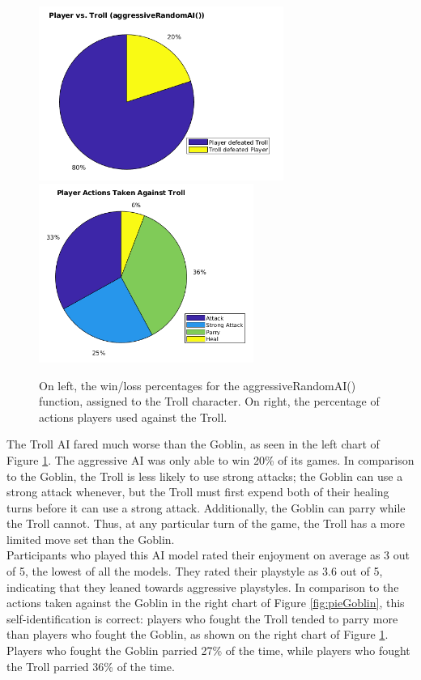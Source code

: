 \begin{figure}[H]
  \centering
  \includegraphics[width=8cm]{figures/trollWins.png}
  \includegraphics[width=7cm]{figures/actionsTroll.png}
  \caption{On left, the win/loss percentages for the aggressiveRandomAI() function, assigned to the Troll character. On right, the percentage of actions players used against the Troll.}
  \label{fig:pieTroll}
\end{figure}

The Troll AI fared much worse than the Goblin, as seen in the left chart of Figure \ref{fig:pieTroll}. The aggressive AI was only able to win 20\% of its games. In comparison to the Goblin, the Troll is less likely to use strong attacks; the Goblin can use a strong attack whenever, but the Troll must first expend both of their healing turns before it can use a strong attack. Additionally, the Goblin can parry while the Troll cannot. Thus, at any particular turn of the game, the Troll has a more limited move set than the Goblin.\\

Participants who played this AI model rated their enjoyment on average as 3 out of 5, the lowest of all the models. They rated their playstyle as 3.6 out of 5, indicating that they leaned towards aggressive playstyles. In comparison to the actions taken against the Goblin in the right chart of Figure \ref{fig:pieGoblin}, this self-identification is correct: players who fought the Troll tended to parry more than players who fought the Goblin, as shown on the right chart of Figure \ref{fig:pieTroll}. Players who fought the Goblin parried 27\% of the time, while players who fought the Troll parried 36\% of the time.\\

